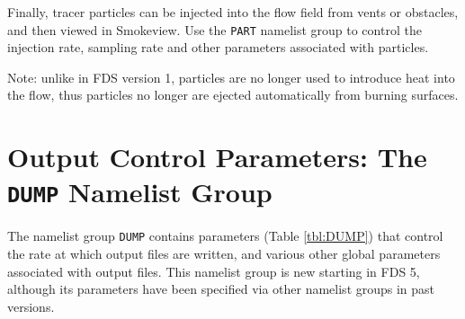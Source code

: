 \documentclass[11pt]{book}
\newcommand{\ct}{\tt\small}
\begin{document}
Finally, tracer particles can be injected into the flow field from
vents or obstacles, and then viewed in Smokeview. Use the {\ct PART}
namelist group to control the injection rate, sampling rate and other
parameters associated with particles.

\begin{warning}
\noindent
Note: unlike in FDS version 1,
particles are no longer used to introduce heat into the flow, thus
particles no longer are ejected automatically from burning surfaces.
\end{warning}


\section{Output Control Parameters: The \texorpdfstring{{\tt DUMP}}{DUMP} Namelist Group}
\label{info:DUMP}

The namelist group {\ct DUMP} contains parameters (Table \ref{tbl:DUMP}) that control the rate at which output files
are written, and various other global parameters associated with output files.
This namelist group is new starting in FDS 5, although its
parameters have been specified via other namelist groups in past versions.
\end{document}
